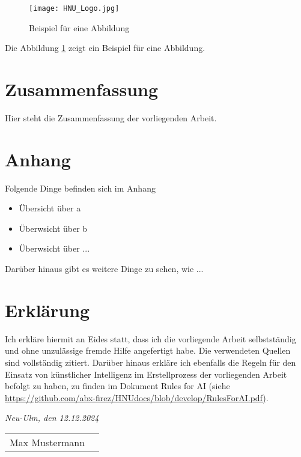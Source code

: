 \documentclass[12pt, a4paper, twoside]{article} %
\newcommand*{\getAuthor}{Max Mustermann}
\begin{document}
\begin{figure}[h!]
\centering
\texttt{[image: HNU\_Logo.jpg]}
\caption{Beispiel für eine Abbildung}
\label{fig:beispiel}
\end{figure}
Die Abbildung \ref{fig:beispiel} zeigt ein Beispiel für eine Abbildung. \lipsum[1]


\newpage 
\section{Zusammenfassung}
Hier steht die Zusammenfassung der vorliegenden Arbeit.


\newpage
\printbibliography %


\newpage
\section{Anhang}
Folgende Dinge befinden sich im Anhang
\begin{itemize}
    \item Übersicht über a
    \item Überwsicht über b
    \item Überwsicht über ...
\end{itemize}

Darüber hinaus gibt es weitere Dinge zu sehen, wie ... 


\newpage
\section*{Erklärung} %
Ich erkläre hiermit an Eides statt, dass ich die vorliegende Arbeit selbstständig und ohne unzulässige fremde Hilfe angefertigt habe. Die verwendeten Quellen sind vollständig zitiert. Darüber hinaus erkläre ich ebenfalls die Regeln für den Einsatz von künstlicher Intelligenz im Erstellprozess der vorliegenden Arbeit befolgt zu haben, zu finden im Dokument Rules for AI (siehe \url{https://github.com/abx-firez/HNUdocs/blob/develop/RulesForAI.pdf)}.
\bigskip
 
\textit{Neu-Ulm, den 12.12.2024}

\smallskip

\begin{flushright}
    \begin{tabular}{cc}
        \\ \hline
        \centering 
        \getAuthor 
    \end{tabular}
\end{flushright}
\end{document}
